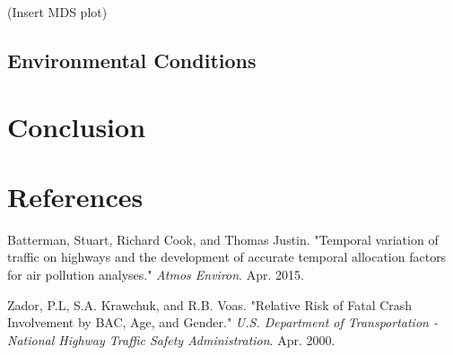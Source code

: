 \documentclass[11pt, oneside]{article}   	%
\begin{document}
(Insert MDS plot) \\



\subsection*{Environmental Conditions}

\section*{Conclusion}

\section*{References}
\begin{hangparas}{1.27cm}{1}
Batterman, Stuart, Richard Cook, and Thomas Justin. "Temporal variation of traffic on highways and the development of accurate temporal allocation factors for air pollution analyses." \textit{Atmos Environ}. Apr. 2015.

Zador, P.L, S.A. Krawchuk, and R.B. Voas. "Relative Risk of Fatal Crash Involvement by BAC, Age, and Gender." \textit{U.S. Department of Transportation - National Highway Traffic Safety Administration}. Apr. 2000.




\end{hangparas}
\end{document}
